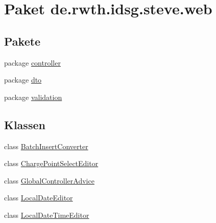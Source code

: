 \hypertarget{namespacede_1_1rwth_1_1idsg_1_1steve_1_1web}{\section{Paket de.\+rwth.\+idsg.\+steve.\+web}
\label{namespacede_1_1rwth_1_1idsg_1_1steve_1_1web}
}
\subsection*{Pakete}
\begin{DoxyCompactItemize}
\item 
package \hyperlink{namespacede_1_1rwth_1_1idsg_1_1steve_1_1web_1_1controller}{controller}
\item 
package \hyperlink{namespacede_1_1rwth_1_1idsg_1_1steve_1_1web_1_1dto}{dto}
\item 
package \hyperlink{namespacede_1_1rwth_1_1idsg_1_1steve_1_1web_1_1validation}{validation}
\end{DoxyCompactItemize}
\subsection*{Klassen}
\begin{DoxyCompactItemize}
\item 
class \hyperlink{classde_1_1rwth_1_1idsg_1_1steve_1_1web_1_1_batch_insert_converter}{Batch\+Insert\+Converter}
\item 
class \hyperlink{classde_1_1rwth_1_1idsg_1_1steve_1_1web_1_1_charge_point_select_editor}{Charge\+Point\+Select\+Editor}
\item 
class \hyperlink{classde_1_1rwth_1_1idsg_1_1steve_1_1web_1_1_global_controller_advice}{Global\+Controller\+Advice}
\item 
class \hyperlink{classde_1_1rwth_1_1idsg_1_1steve_1_1web_1_1_local_date_editor}{Local\+Date\+Editor}
\item 
class \hyperlink{classde_1_1rwth_1_1idsg_1_1steve_1_1web_1_1_local_date_time_editor}{Local\+Date\+Time\+Editor}
\end{DoxyCompactItemize}
